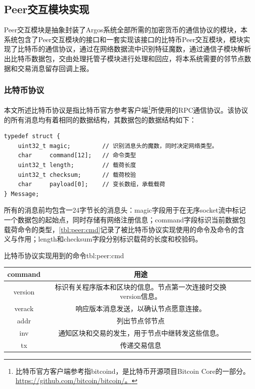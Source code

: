 \documentclass[supercite]{HustGraduPaper}
\newcommand{\rtbl}[1]{\autoref{tbl:#1}}
\theoremstyle{definition}
\begin{document}
\subsection{Peer交互模块实现}\label{sec:peer}
Peer交互模块是抽象封装了Argos系统全部所需的加密货币的通信协议的模块，本系统包含了Peer交互模块的接口和一套实现该接口的比特币Peer交互模块，模块实现了比特币的通信协议，通过在网络数据流中识别特征魔数，通过通信子模块解析出比特币数据包，交由处理托管子模块进行处理和回应，将本系统需要的邻节点数据和交易消息留存回调上报。
\subsubsection{比特币协议}
本文所述比特币协议是指比特币官方参考客户端\footnote{比特币官方客户端参考指bitcoind，是比特币开源项目Bitcoin Core的一部分。\url{https://github.com/bitcoin/bitcoin/。}}所使用的RPC通信协议。该协议的所有消息均有着相同的数据结构，其数据包的数据结构如下：
\begin{verbatim}
typedef struct {
    uint32_t magic;         // 识别消息头的魔数，同时决定网络类型。
    char     command[12];   // 命令类型
    uint32_t length;        // 载荷长度
    uint32_t checksum;      // 载荷校验
    char     payload[0];    // 变长数组，承载载荷
} Message;
\end{verbatim}


所有的消息前均包含一24字节长的消息头：magic字段用于在无序socket流中标记一个数据包的起始点，同时存储有网络注册信息；command字段标识当前数据包载荷命令的类型，\rtbl{peer:cmd}记录了被比特币协议实现使用的命令及命令的含义与作用；length和checksum字段分别标识载荷的长度和校验码。

\begin{generaltab}{比特币协议实现用到的命令}{tbl:peer:cmd}
  \begin{tabular}{c|ccc}
    \toprule
    command & 用途  \\
    \midrule
    version & 标识有关程序版本和区块的信息。节点第一次连接时交换version信息。\\
    verack  & 响应版本消息发送，以确认节点愿意连接。 \\
    addr    & 列出节点邻节点 \\
    inv     & 通知区块和交易的发生，用于节点中继转发这些信息。\\
    tx      & 传递交易信息 \\
    \bottomrule
  \end{tabular}
\end{generaltab}
\end{document}
